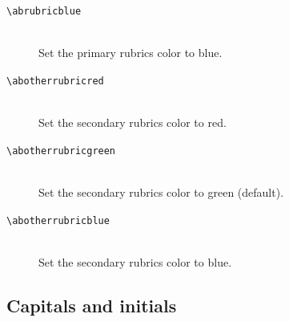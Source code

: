 \documentclass[a4paper]{article}
\newcommand{\ltxncmd}[1]{\texttt{\textbackslash{}#1}}
\begin{document}
\begin{description}
\item [\ltxncmd{abrubricblue}]\mbox{}  \\
  Set the primary rubrics color to blue. 

\item [\ltxncmd{abotherrubricred}]\mbox{}  \\
  Set the secondary rubrics color to red. 

\item [\ltxncmd{abotherrubricgreen}]\mbox{} \\
  Set the secondary rubrics color to green (default). 

\item [\ltxncmd{abotherrubricblue}]\mbox{} \\
  Set the secondary rubrics color to blue.

\end{description}

\subsection{Capitals and initials}
\end{document}
